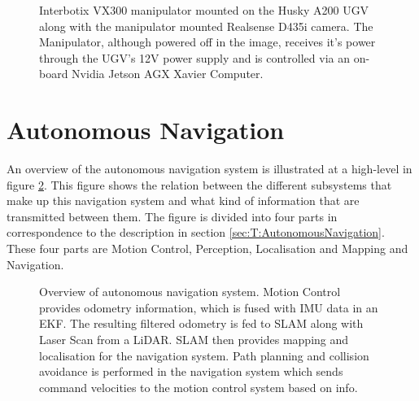 \begin{figure}[htp!]
\begin{minipage}[b]{0.49\textwidth}
  \end{minipage}
  \caption{Interbotix VX300 manipulator mounted on the Husky A200 UGV along with the manipulator mounted Realsense D435i camera. The Manipulator, although powered off in the image, receives it's power through the UGV's 12V power supply and is controlled via an on-board Nvidia Jetson AGX Xavier Computer.}
  \label{fig:M:H:M:M:MMC:Vx300Complete}
\end{figure}




\section{Autonomous Navigation} \label{sec:M:AutonomousNavigation}
An overview of the autonomous navigation system is illustrated at a high-level in figure \ref{fig:M:AN:ANMethod}. This figure shows the relation between the different subsystems that make up this navigation system and what kind of information that are transmitted between them. The figure is divided into four parts in correspondence to the description in section \ref{sec:T:AutonomousNavigation}. These four parts are Motion Control, Perception, Localisation and Mapping and Navigation. 

\begin{figure}[htp!]
    \fontsize{7}{14}\selectfont
    \centering
    
    \caption{Overview of autonomous navigation system. Motion Control provides odometry information, which is fused with IMU data in an EKF. The resulting filtered odometry is fed to SLAM along with Laser Scan from a LiDAR. SLAM then provides mapping and localisation for the navigation system. Path planning and collision avoidance is performed in the navigation system which sends command velocities to the motion control system based on info.}
    \label{fig:M:AN:ANMethod}
\end{figure}

